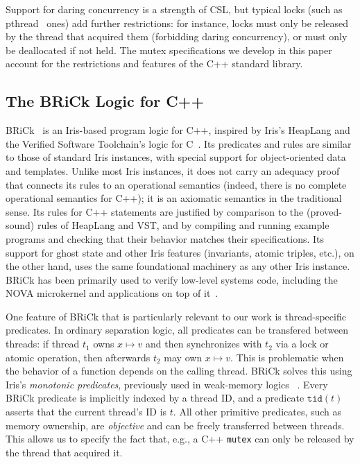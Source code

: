 \documentclass[acmsmall,screen,review,anonymous]{acmart}
\begin{document}
Support for daring concurrency is a strength of CSL, but typical locks (such
as pthread~\cite{pthread} ones) add further restrictions: for instance, locks must only be
released by the thread that acquired them (forbidding daring concurrency), or
must only be deallocated if not held.
The mutex specifications we develop in this paper account for the restrictions and
features of the C++ standard library.

\subsection{The BRiCk Logic for C++}
\label{brick}

\newcommand{\currentthread}[1]{\ensuremath{\mathtt{tid}(#1)}}

BRiCk~\cite{brick} is an Iris-based program logic for C++, inspired by Iris's HeapLang and the Verified Software Toolchain's logic for C~\cite{vst}. Its predicates and rules are similar to those of standard Iris instances, with special support for object-oriented data and templates. %
Unlike most Iris instances, it does not carry an adequacy proof that connects its rules to an operational semantics (indeed, there is no complete operational semantics for C++); it is an axiomatic semantics in the traditional sense. Its rules for C++ statements are justified by comparison to the (proved-sound) rules of HeapLang and VST, and by compiling and running example programs and checking that their behavior matches their specifications. Its support for ghost state and other Iris features (invariants, atomic triples, etc.), on the other hand, uses the same foundational machinery as any other Iris instance. BRiCk has been primarily used to verify low-level systems code, including the NOVA microkernel and applications on top of it~\cite{brick-os}.

One feature of BRiCk that is particularly relevant to our work is thread-specific predicates. In ordinary separation logic, all predicates can be transfered between threads: if thread $t_1$ owns $x \mapsto v$ and then synchronizes with $t_2$ via a lock or atomic operation, then afterwards $t_2$ may own $x \mapsto v$. This is problematic when the behavior of a function depends on the calling thread. BRiCk solves this using Iris's \emph{monotonic predicates}, previously used in weak-memory logics~\cite{igps} %
. Every BRiCk predicate is implicitly indexed by a thread ID, and a predicate $\currentthread{t}$ asserts that the current thread's ID is $t$. All other primitive predicates, such as memory ownership, are \emph{objective} and can be freely transferred between threads. This allows us to specify the fact that, e.g., a C++ \lstinline{mutex} can only be released by the thread that acquired it.
\end{document}
